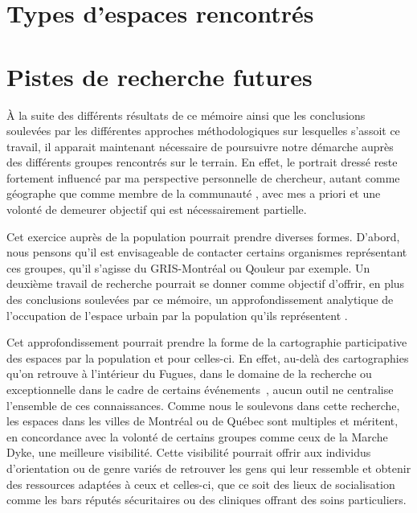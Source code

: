 \section{Types d'espaces rencontrés}
\label{sec:types_d_espaces_rencontr_s}


\section{Pistes de recherche futures}
\label{sec:pistes_de_recherches}

À la suite des différents résultats de ce mémoire ainsi que les conclusions soulevées par les différentes approches méthodologiques sur lesquelles s'assoit ce travail, il apparait maintenant nécessaire de poursuivre notre démarche auprès des différents groupes rencontrés sur le terrain.
En effet, le portrait dressé reste fortement influencé par ma perspective personnelle de chercheur, autant comme géographe que comme membre de la communauté \lgbt{}, avec mes a priori et une volonté de demeurer objectif qui est nécessairement partielle.

Cet exercice auprès de la population pourrait prendre diverses formes. 
D'abord, nous pensons qu'il est envisageable de contacter certains organismes représentant ces groupes, qu'il s'agisse du GRIS-Montréal ou Qouleur par exemple. 
Un deuxième travail de recherche pourrait se donner comme objectif d'offrir, en plus des conclusions soulevées par ce mémoire, un approfondissement analytique de l'occupation de l'espace urbain par la population qu'ils représentent .

Cet approfondissement pourrait prendre la forme de la cartographie participative des espaces \lgbt{} par la population et pour celles-ci.
En effet, au-delà des cartographies qu'on retrouve à l'intérieur du Fugues, dans le domaine de la recherche  ou exceptionnelle dans le cadre de certains événements~\parencite{Pervers/Cite2015}, aucun outil ne centralise l'ensemble de ces connaissances. 
Comme nous le soulevons dans cette recherche, les espaces \lgbt{} dans les villes de Montréal ou de Québec sont multiples et méritent, en concordance avec la volonté de certains groupes comme ceux de la Marche Dyke, une meilleure visibilité.
Cette visibilité pourrait offrir aux individus d'orientation ou de genre variés de retrouver les gens qui leur ressemble et obtenir des ressources adaptées à ceux et celles-ci, que ce soit des lieux de socialisation comme les bars réputés sécuritaires ou des cliniques offrant des soins particuliers.

